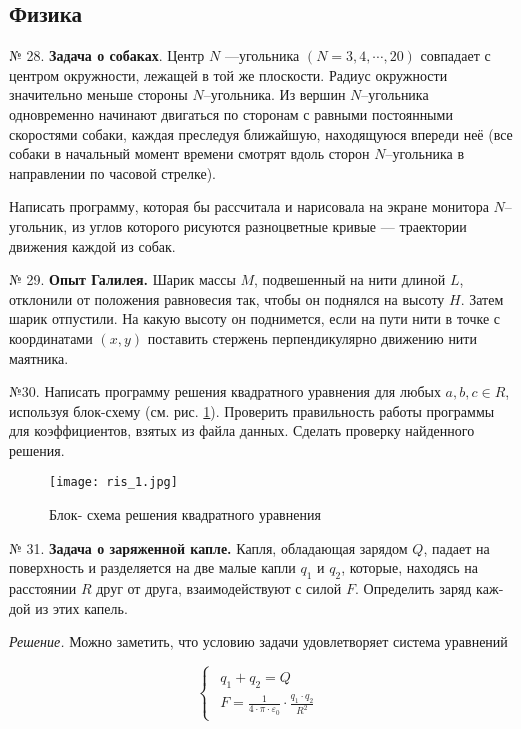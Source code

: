 \subsection{Физика}

\hspace{7mm} № 28. {\bf Задача о собаках}.
Центр $N$ ---угольника $(N = 3, 4,\cdots, 20)$ совпадает с центром окружности, лежащей в той же плоскости. Радиус окружности значительно меньше стороны $N$--угольника. Из вершин $N$--угольника одновременно начинают двигаться по сторонам с равными постоянными скоростями собаки, каждая преследуя ближайшую, находящуюся впереди неё (все собаки в начальный момент времени смотрят вдоль сторон $N$--угольника в направлении по часовой стрелке).

Написать программу, которая бы рассчитала и нарисовала на экране монитора $N$--угольник, из углов которого рисуются разноцветные кривые --- траектории движения каждой из собак.

№ 29. {\bf Опыт Галилея.}
Шарик массы $M$, подвешенный на нити длиной $L$, отклонили от положения равновесия так, чтобы он поднялся на высоту $H$. Затем шарик отпустили. На какую высоту он поднимется, если на пути нити в точке с координатами $(x, y)$ поставить стержень перпендикулярно движению нити маятника.

№30. Написать программу решения квадратного уравнения для любых $a,b,c \in R$, используя блок-схему (см. рис. \ref{ris1}). Проверить правильность работы программы для коэффициентов, взятых из файла данных. Сделать проверку найденного решения.

\begin{figure}[!hb]
\centerline{\texttt{[image: ris\_1.jpg]}}
\caption{Блок- схема решения квадратного уравнения}
\label{ris1}
\end{figure}

№ 31. {\bf Задача о заряженной капле.}
Капля, обладающая зарядом $Q$, падает на поверхность и раз­деляется на две малые капли $q_1$ и $q_2$, которые, находясь на расстоянии $R$ друг от друга, взаимодействуют с силой $F$. Определить заряд каж­дой из этих капель.

{\it Решение.} Можно заметить, что условию задачи удовлетворяет система уравнений

\begin{equation}
 \begin{cases}
 \begin{aligned}
   q_1 + q_2 = Q\\
   F = \frac{1}{4\cdot\pi\cdot\varepsilon_0}\cdot\frac{q_1\cdot q_2}{R^2}
   \end{aligned}
 \end{cases}
\end{equation}

